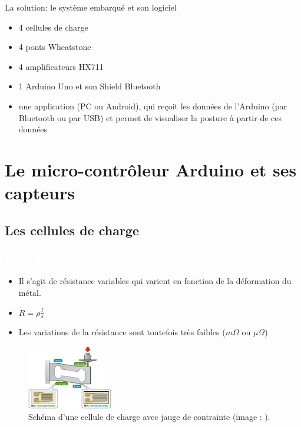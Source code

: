 \documentclass{beamer}
\begin{document}
\begin{frame}
\begin{block}{La solution: le système embarqué et son logiciel}
\begin{itemize}
\item 4 cellules de charge %
\item 4 ponts Wheatstone %
\item 4 amplificateurs HX711 %
\item 1 Arduino Uno et son Shield Bluetooth%
\item une application (PC ou Android), qui reçoit les données de l'Arduino (par Bluetooth ou par USB) et permet de visualiser la posture à partir de ces données
\end{itemize}
\end{block}
\end{frame}

\section{Le micro-contrôleur Arduino et ses capteurs}

\subsection{Les cellules de charge}
\begin{frame}
\frametitle{\textcolor{white}{Les cellules de charge}}
\begin{itemize}
\item Il s'agit de résistance variables qui varient en fonction de la déformation du métal.
\item $R=\rho \frac{l}{s}$
\item Les variations de la résistance sont toutefois très faibles ($m\Omega$ ou $\mu\Omega$)
\end{itemize}
\begin{figure}
\begin{center}
\includegraphics[height=2.8cm]{images/load_cell.jpg}
\end{center}
\caption{Schéma d'une cellule de charge avec jauge de contrainte (image : \cite{sparkfun}).}
\label{fig:load_cell_sparkfun}
\end{figure}
\end{frame}
\end{document}
